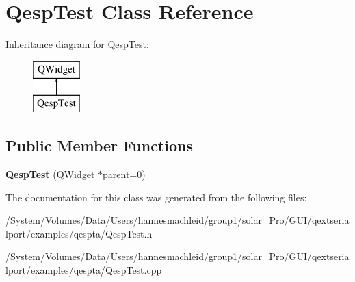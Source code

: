 \hypertarget{class_qesp_test}{}\section{Qesp\+Test Class Reference}
\label{class_qesp_test}
Inheritance diagram for Qesp\+Test\+:\begin{figure}[H]
\begin{center}
\leavevmode
\includegraphics[height=2.000000cm]{class_qesp_test}
\end{center}
\end{figure}
\subsection*{Public Member Functions}
\begin{DoxyCompactItemize}
\item 
\mbox{\label{class_qesp_test_a12e1b013da4cfafd9b18d6a36a219566}} 
{\bfseries Qesp\+Test} (Q\+Widget $\ast$parent=0)
\end{DoxyCompactItemize}


The documentation for this class was generated from the following files\+:\begin{DoxyCompactItemize}
\item 
/\+System/\+Volumes/\+Data/\+Users/hannesmachleid/group1/solar\+\_\+\+Pro/\+G\+U\+I/qextserialport/examples/qespta/Qesp\+Test.\+h\item 
/\+System/\+Volumes/\+Data/\+Users/hannesmachleid/group1/solar\+\_\+\+Pro/\+G\+U\+I/qextserialport/examples/qespta/Qesp\+Test.\+cpp\end{DoxyCompactItemize}
